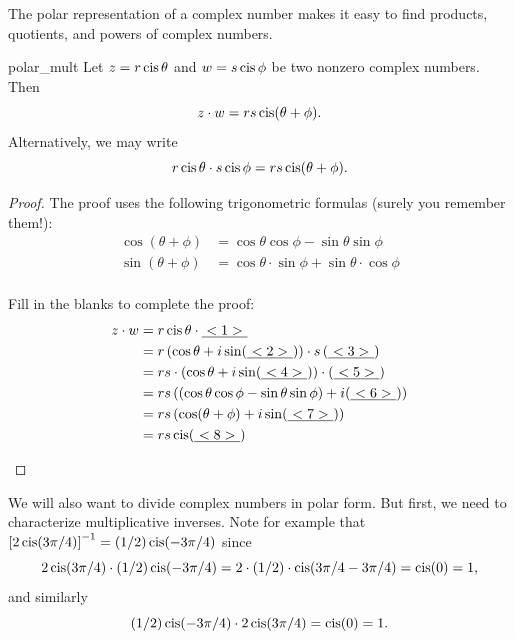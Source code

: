 The polar representation of a complex number makes it easy to find
products, quotients, and powers of complex numbers. 

\begin{prop}{polar_mult} Let $z=r\operatorname{cis}\theta$ and $w=s\operatorname{cis}\phi$
be two nonzero complex numbers. Then 
\[z \cdot w=rs\operatorname{cis}(\theta+\phi).\]
Alternatively, we may write
\[r \operatorname{cis} \theta \cdot s \operatorname{cis} \phi =rs\operatorname{cis}(\theta+\phi).\]
 \end{prop}

\begin{proof}
The proof uses the following trigonometric formulas (surely you remember them!):
\newline
\begin{align*}
 \cos(\theta + \phi ) &= \cos\theta\cos\phi - \sin\theta\sin\phi \\
 \sin(\theta + \phi ) &= \cos\theta \cdot \sin\phi + \sin\theta \cdot \cos\phi \\
\end{align*}
\begin{exercise}{24} Fill in the blanks to complete the proof:
\begin{align*}
z \cdot w &= r\operatorname{cis}\theta \cdot \underline{~<1>~} \\
 &= r \left( \cos\theta + i \sin(\underline{~<2>~}) \right) \cdot s  \left( \underline{~<3>~} \right) \\
 &=  rs \cdot \left( \cos\theta + i \sin(\underline{~<4>~}) \right) \cdot  \left( \underline{~<5>~}\right) \\
 &=  rs \left( (\cos\theta \cos\phi   - \sin\theta \sin\phi)  + i(\underline{~<6>~}) \right)\\
 &=  rs  \left( \cos(\theta + \phi) + i\sin( \underline{~<7>~}) \right) \\
 &=  r s  \operatorname{cis}( \underline{~<8>~}) \\
\end{align*}
\end{exercise}
\end{proof}

We will also want to divide complex numbers in polar form. But first, we need to characterize multiplicative inverses. Note for example that $\left[2 \operatorname{cis} (3\pi / 4)\right]^{-1} = (1/2) \operatorname{cis} (-3 \pi/4)$ since
\[ 2 \operatorname{cis} (3\pi / 4) \cdot (1/2) \operatorname{cis} (-3 \pi/4) = 2 \cdot (1/2) \cdot \operatorname{cis}( 3\pi/4 -3 \pi /4) = \operatorname{cis}(0) = 1, \]
and similarly
\[ (1/2) \operatorname{cis} (-3 \pi/4) \cdot 2 \operatorname{cis} (3\pi / 4)  = \operatorname{cis}(0) = 1. \]

